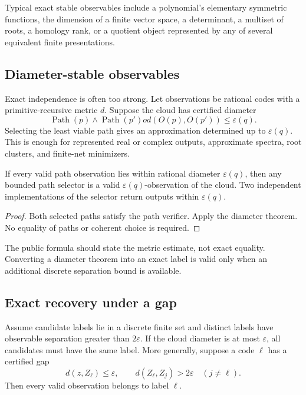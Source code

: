 Typical exact stable observables include a polynomial's elementary symmetric functions, the dimension of a
finite vector space, a determinant, a multiset of roots, a homology rank, or a quotient object represented
by any of several equivalent finite presentations.

\subsection{Diameter-stable observables}

Exact independence is often too strong.  Let observations be rational codes with a primitive-recursive
metric \(d\).  Suppose the cloud has certified diameter
\[
  \operatorname{Path}(p)\wedge\operatorname{Path}(p')	o
  d(O(p),O(p'))\le\varepsilon(q).
\]
Selecting the least viable path gives an approximation determined up to \(\varepsilon(q)\).  This is enough
for represented real or complex outputs, approximate spectra, root clusters, and finite-net minimizers.

\begin{theorem}
If every valid path observation lies within rational diameter \(\varepsilon(q)\), then any bounded path
selector is a valid \(\varepsilon(q)\)-observation of the cloud.  Two independent implementations of the
selector return outputs within \(\varepsilon(q)\).
\end{theorem}
\begin{proof}
Both selected paths satisfy the path verifier.  Apply the diameter theorem.  No equality of paths or
coherent choice is required.
\end{proof}

The public formula should state the metric estimate, not exact equality.  Converting a diameter theorem into
an exact label is valid only when an additional discrete separation bound is available.

\subsection{Exact recovery under a gap}

Assume candidate labels lie in a discrete finite set and distinct labels have observable separation greater
than \(2\varepsilon\).  If the cloud diameter is at most \(\varepsilon\), all candidates must have the same
label.  More generally, suppose a code \(\ell\) has a certified gap
\[
  d(z,Z_\ell)\le\varepsilon,
  \qquad
  d(Z_\ell,Z_j)>2\varepsilon\quad(j\ne\ell).
\]
Then every valid observation belongs to label \(\ell\).

